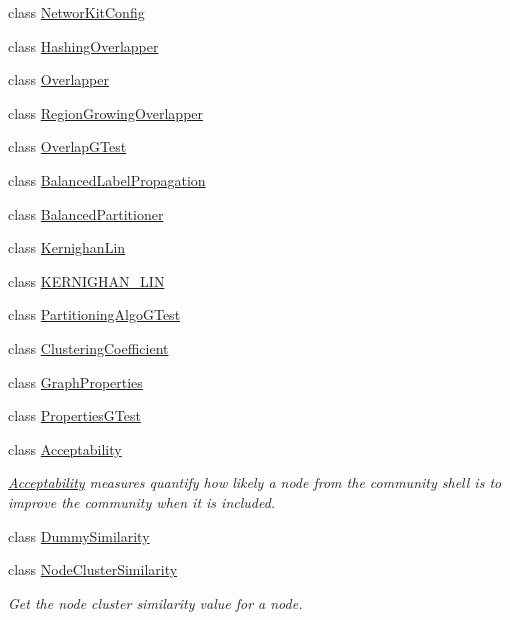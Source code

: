 \begin{DoxyCompactItemize}
class \hyperlink{class_networ_kit_1_1_networ_kit_config}{Networ\-Kit\-Config}
\item 
class \hyperlink{class_networ_kit_1_1_hashing_overlapper}{Hashing\-Overlapper}
\item 
class \hyperlink{class_networ_kit_1_1_overlapper}{Overlapper}
\item 
class \hyperlink{class_networ_kit_1_1_region_growing_overlapper}{Region\-Growing\-Overlapper}
\item 
class \hyperlink{class_networ_kit_1_1_overlap_g_test}{Overlap\-G\-Test}
\item 
class \hyperlink{class_networ_kit_1_1_balanced_label_propagation}{Balanced\-Label\-Propagation}
\item 
class \hyperlink{class_networ_kit_1_1_balanced_partitioner}{Balanced\-Partitioner}
\item 
class \hyperlink{class_networ_kit_1_1_kernighan_lin}{Kernighan\-Lin}
\item 
class \hyperlink{class_networ_kit_1_1_k_e_r_n_i_g_h_a_n___l_i_n}{K\-E\-R\-N\-I\-G\-H\-A\-N\-\_\-\-L\-I\-N}
\item 
class \hyperlink{class_networ_kit_1_1_partitioning_algo_g_test}{Partitioning\-Algo\-G\-Test}
\item 
class \hyperlink{class_networ_kit_1_1_clustering_coefficient}{Clustering\-Coefficient}
\item 
class \hyperlink{class_networ_kit_1_1_graph_properties}{Graph\-Properties}
\item 
class \hyperlink{class_networ_kit_1_1_properties_g_test}{Properties\-G\-Test}
\item 
class \hyperlink{class_networ_kit_1_1_acceptability}{Acceptability}
\begin{DoxyCompactList}\small\item\em \hyperlink{class_networ_kit_1_1_acceptability}{Acceptability} measures quantify how likely a node from the community shell is to improve the community when it is included. \end{DoxyCompactList}\item 
class \hyperlink{class_networ_kit_1_1_dummy_similarity}{Dummy\-Similarity}
\item 
class \hyperlink{class_networ_kit_1_1_node_cluster_similarity}{Node\-Cluster\-Similarity}
\begin{DoxyCompactList}\small\item\em Get the node cluster similarity value for a node. \end{DoxyCompactList}\item 

\end{DoxyCompactItemize}
